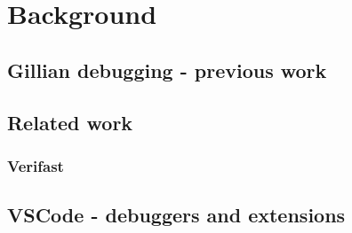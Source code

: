 \chapter{Background}
\section{Gillian debugging - previous work}

\section{Related work}
\subsection{Verifast}

\section{VSCode - debuggers and extensions}
